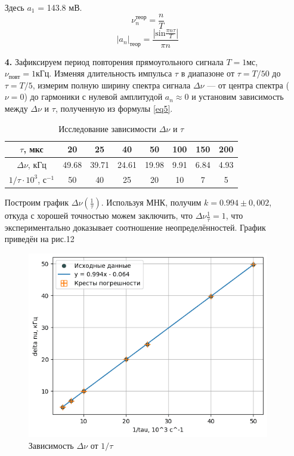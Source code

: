 \documentclass[a4paper,12pt]{article}
\begin{document}
\begin{enumerate}
Здесь $a_1$ = 143.8 мВ.
$$\nu_n^\text{теор} = \frac{n}{T}$$
$$|a_n|_\text{теор} = \frac{|\text{sin}\frac{\pi n \tau}{T}|}{\pi n}$$

\item[\textbf{4.}] Зафиксируем период повторения прямоугольного сигнала $T = 1 \text{мс}$, $\nu_\text{повт} = 1\text{кГц}$. Изменяя длительность импульса $\tau$ в диапазоне от
$\tau=T/50$ до $\tau=T/5$, измерим полную ширину спектра сигнала $\Delta \nu$ — от центра спектра ($\nu = 0$) до гармоники с нулевой амплитудой $a_n \approx 0$ и установим зависимость между $\Delta \nu$ и $\tau$, полученную из формулы \ref{eq5}.

\begin{table}[h!]
    \centering
    \begin{tabular}{|c|c|c|c|c|c|c|c|}
\hline
$\tau$, мкс & 20 & 25 & 40 & 50 & 100 & 150 & 200 \\ \hline
$\Delta \nu$, кГц & 49.68 & 39.71 & 24.61 & 19.98 & 9.91 & 6.84 & 4.93 \\ \hline
$1/\tau \cdot 10^3$, с$^{-1}$ & 50 & 40 & 25 & 20 & 10 & 7 & 5 \\ \hline
\end{tabular}
    \caption{Исследование зависимости $\Delta \nu$ и $\tau$}
    \label{table2}
\end{table}
Построим график $\Delta\nu\left(\frac{1}{\tau}\right)$. Используя МНК, получим $k=0.994\pm0,002$, откуда с хорошей точностью можем заключить, что $\Delta\nu\frac{1}{\tau}=1$, что экспериментально доказывает соотношение неопределённостей. График приведён на рис.12
\begin{figure}[h]
    \centering
    \includegraphics[width=0.7\linewidth]{grafic1.png}
    \caption{Зависимость $\Delta \nu$ от $1/\tau$}
    \label{grafic1}
\end{figure}


\end{enumerate}
\end{document}

